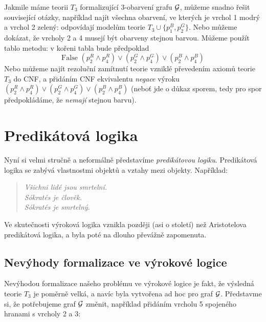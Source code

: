 Jakmile máme teorii \(T_3\) formalizující 3-obarvení grafu \( \mathcal{G} \), můžeme snadno řešit související otázky, například najít všechna obarvení, ve kterých je vrchol 1 modrý a vrchol 2 zelený: odpovídají modelům teorie \( T_3 \cup \{ p_1^B, p_2^G\} \). Nebo můžeme dokázat, že vrcholy 2 a 4 musejí být obarveny stejnou barvou. Můžeme použít tablo metodu: v kořeni tabla bude předpoklad
\[
\text{False  }(p_2^R \land p_4^R)\lor(p_2^G \land p_4^G)\lor(p_2^B \land p_4^B)
\]
Nebo můžeme najít rezoluční zamítnutí teorie vzniklé převedením axiomů teorie \( T_3 \) do CNF, a přidáním CNF ekvivalentu \emph{negace} výroku \( (p_2^R \land p_4^R)\lor(p_2^G \land p_4^G)\lor(p_2^B \land p_4^B) \)	(neboť jde o důkaz sporem, tedy pro spor předpokládáme, že \emph{nemají} stejnou barvu).



\section{Predikátová logika}

Nyní si velmi stručně a neformálně představíme \emph{predikátovou logiku}. Predikátová logika se zabývá vlastnostmi objektů a vztahy mezi objekty. Například:
\begin{quote}\it
    Všichni lidé jsou smrtelní.\\
    Sókratés je člověk.\\
    Sókratés je smrtelný.
\end{quote}
Ve skutečnosti výroková logika vznikla později (asi o století) než Aristotelova predikátová logika, a byla poté na dlouho převážně zapomenuta.


\subsection{Nevýhody formalizace ve výrokové logice}\label{subsection:disadvantages-of-propositional-logic}

Nevýhodou formalizace našeho problému ve výrokové logice je fakt, že výsledná teorie \( T_3 \) je poměrně velká, a navíc byla vytvořena ad hoc pro graf  \( \mathcal{G} \). Představme si, že potřebujeme graf \( \mathcal{G} \) změnit, například přidáním vrcholu 5 spojeného hranami s vrcholy 2 a 3:

\begin{center}
\end{center}

